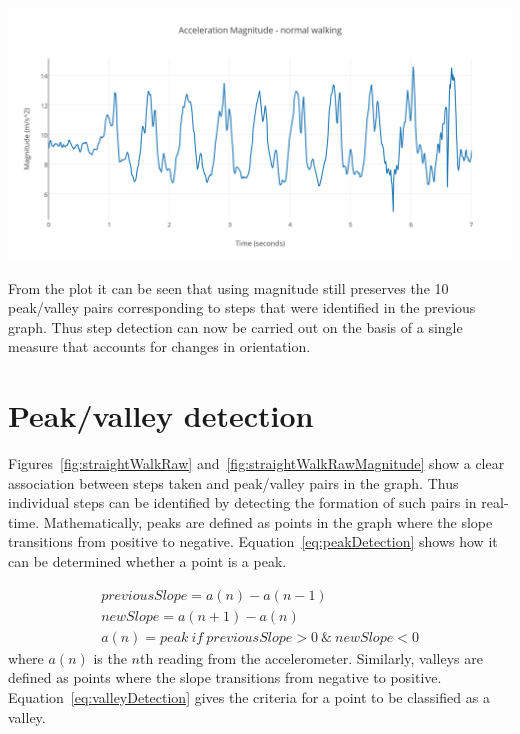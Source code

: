 \documentclass[12pt,a4paper,notitlepage]{report}
\begin{document}
\begin{center}
\includegraphics[scale=0.9]{images/straightWalkRawMagnitude.png}
\label{fig:straightWalkRawMagnitude}
\end{center}

From the plot it can be seen that using magnitude still preserves the 10 peak/valley pairs corresponding to steps that were identified in the previous graph. Thus step detection can now be carried out on the basis of a single measure that accounts for changes in orientation. 

\section*{Peak/valley detection}

Figures~\ref{fig:straightWalkRaw} and~\ref{fig:straightWalkRawMagnitude} show a clear association between steps taken and peak/valley pairs in the graph. Thus individual steps can be identified by detecting the formation of such pairs in real-time. Mathematically, peaks are defined as points in the graph where the slope transitions from positive to negative. Equation~\ref{eq:peakDetection} shows how it can be determined whether a point is a peak. 

\begin{equation}\label{eq:peakDetection}
\begin{split}
previousSlope = a(n) - a(n-1) \\
newSlope = a(n+1) - a(n) \\
a(n) = peak\ if\ previousSlope > 0\ \&\ newSlope < 0
\end{split}
\end{equation}
where $a(n)$ is the $n$th reading from the accelerometer. Similarly, valleys are defined as points where the slope transitions from negative to positive. Equation~\ref{eq:valleyDetection} gives the criteria for a point to be classified as a valley. 
\end{document}
